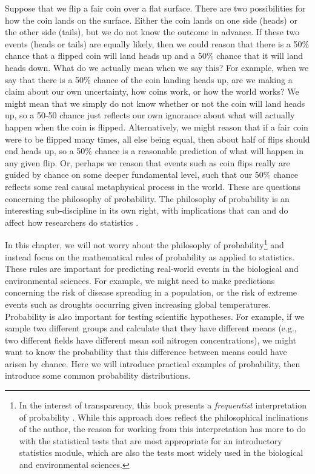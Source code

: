 \documentclass[
]{scrbook}
\begin{document}
Suppose that we flip a fair coin over a flat surface.
There are two possibilities for how the coin lands on the surface.
Either the coin lands on one side (heads) or the other side (tails), but we do not know the outcome in advance.
If these two events (heads or tails) are equally likely, then we could reason that there is a 50\% chance that a flipped coin will land heads up and a 50\% chance that it will land heads down.
What do we actually mean when we say this?
For example, when we say that there is a 50\% chance of the coin landing heads up, are we making a claim about our own uncertainty, how coins work, or how the world works?
We might mean that we simply do not know whether or not the coin will land heads up, so a 50-50 chance just reflects our own ignorance about what will actually happen when the coin is flipped.
Alternatively, we might reason that if a fair coin were to be flipped many times, all else being equal, then about half of flips should end heads up, so a 50\% chance is a reasonable prediction of what will happen in any given flip.
Or, perhaps we reason that events such as coin flips really are guided by chance on some deeper fundamental level, such that our 50\% chance reflects some real causal metaphysical process in the world.
These are questions concerning the philosophy of probability.
The philosophy of probability is an interesting sub-discipline in its own right, with implications that can and do affect how researchers do statistics \citep{Edwards1972, Mayo1996, Gelman2013, Suarez2020, Mayo2021, Navarro2022}.

In this chapter, we will not worry about the philosophy of probability\footnote{In the interest of transparency, this book presents a \emph{frequentist} interpretation of probability \citep{Mayo1996}. While this approach does reflect the philosophical inclinations of the author, the reason for working from this interpretation has more to do with the statistical tests that are most appropriate for an introductory statistics module, which are also the tests most widely used in the biological and environmental sciences.} and instead focus on the mathematical rules of probability as applied to statistics.
These rules are important for predicting real-world events in the biological and environmental sciences.
For example, we might need to make predictions concerning the risk of disease spreading in a population, or the risk of extreme events such as droughts occurring given increasing global temperatures.
Probability is also important for testing scientific hypotheses.
For example, if we sample two different groups and calculate that they have different means (e.g., two different fields have different mean soil nitrogen concentrations), we might want to know the probability that this difference between means could have arisen by chance.
Here we will introduce practical examples of probability, then introduce some common probability distributions.
\end{document}
